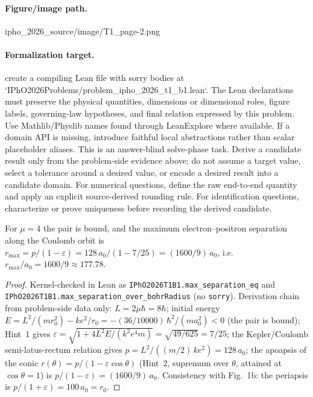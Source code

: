 \paragraph{Figure/image path.}
ipho\_2026\_source/image/T1\_page-2.png

\paragraph{Formalization target.}
create a compiling Lean file with sorry bodies at `IPhO2026Problems/problem\_ipho\_2026\_t1\_b1.lean`.
The Lean declarations must preserve the physical quantities, dimensions or dimensional roles, figure labels, governing-law hypotheses, and final relation expressed by this problem.
Use Mathlib/Physlib names found through LeanExplore where available. If a domain API is missing, introduce faithful local abstractions rather than scalar placeholder aliases.
This is an answer-blind solve-phase task. Derive a candidate result only from the problem-side evidence above; do not assume a target value, select a tolerance around a desired value, or encode a desired result into a candidate domain.
For numerical questions, define the raw end-to-end quantity and apply an explicit source-derived rounding rule. For identification questions, characterize or prove uniqueness before recording the derived candidate.

\begin{theorem}
\label{thm:physics:ipho_2026_t1_b1:target}
\leanok
For $\mu = 4$ the pair is bound, and the maximum electron--positron
separation along the Coulomb orbit is
$r_{\max} = p/(1-\varepsilon) = 128\,a_0/(1 - 7/25) = (1600/9)\,a_0$,
i.e. $r_{\max}/a_0 = 1600/9 \approx 177.78$.
\end{theorem}
\begin{proof}
\leanok
Kernel-checked in Lean as \texttt{IPhO2026T1B1.max\_separation\_eq} and
\texttt{IPhO2026T1B1.max\_separation\_over\_bohrRadius} (no \texttt{sorry}).
Derivation chain from problem-side data only: $L = 2\mu\hbar = 8\hbar$;
initial energy $E = L^2/(m r_0^2) - k e^2/r_0
= -(36/10000)\,\hbar^2/(m a_0^2) < 0$ (the pair is bound); Hint~1 gives
$\varepsilon = \sqrt{1 + 4L^2E/(k^2e^4m)} = \sqrt{49/625} = 7/25$; the
Kepler/Coulomb semi-latus-rectum relation gives
$p = L^2/((m/2)\,k e^2) = 128\,a_0$; the apoapsis of the conic
$r(\theta) = p/(1 - \varepsilon\cos\theta)$ (Hint~2, supremum over $\theta$,
attained at $\cos\theta = 1$) is $p/(1-\varepsilon) = (1600/9)\,a_0$.
Consistency with Fig.~1b: the periapsis is $p/(1+\varepsilon) = 100\,a_0 = r_0$.
\end{proof}
